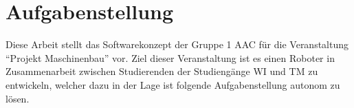 \section{Aufgabenstellung}

Diese Arbeit stellt das Softwarekonzept der Gruppe 1 \ac{AAC} für die Veranstaltung \enquote{Projekt Maschinenbau} vor.
Ziel dieser Veranstaltung ist es einen Roboter in Zusammenarbeit zwischen Studierenden der Studiengänge \ac{WI} und \ac{TM} zu entwickeln, welcher dazu in der Lage ist folgende Aufgabenstellung autonom zu lösen.
